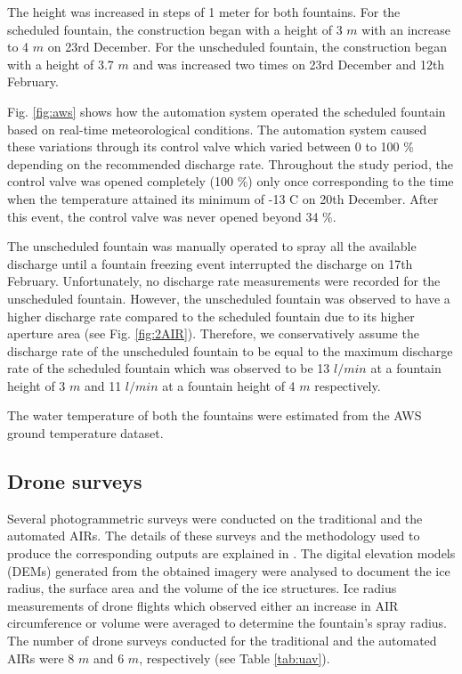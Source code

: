 \documentclass[tc, manuscript]{copernicus}
\begin{document}
The height was increased in steps of 1 meter for both fountains. For the scheduled fountain, the
construction began with a height of 3 $m$ with an increase to 4 $m$ on 23rd December. For the unscheduled
fountain, the construction began with a height of 3.7 $m$ and was increased two times on 23rd December
and 12th February.

Fig. \ref{fig:aws} shows how the automation system operated the scheduled fountain based on real-time
meteorological conditions. The automation system caused these variations through its control valve which varied
between 0 to 100 \% depending on the recommended discharge rate. Throughout the study period, the control valve
was opened completely (100 \%) only once corresponding to the time when the temperature attained its minimum of
-13 \degree C on 20th December. After this event, the control valve was never opened beyond 34 \%.  

The unscheduled fountain was manually operated to spray all the available discharge until a fountain freezing
event interrupted the discharge on 17th February. Unfortunately, no discharge rate measurements were recorded
for the unscheduled fountain. However, the unscheduled fountain was observed to have a higher discharge rate
compared to the scheduled fountain due to its higher aperture area (see Fig. \ref{fig:2AIR}). Therefore, we
conservatively assume the discharge rate of the unscheduled fountain to be equal to the maximum discharge rate
of the scheduled fountain which was observed to be 13 $l/min$ at a fountain height of 3 $m$ and 11 $l/min$ at a
fountain height of 4 $m$ respectively.

The water temperature of both the fountains were estimated from the AWS ground temperature dataset.

\subsection{Drone surveys}

Several photogrammetric surveys were conducted on the traditional and the automated AIRs. The details of these
surveys and the methodology used to produce the corresponding outputs are explained in
\cite{balasubramanianInfluenceMeteorologicalConditions2022}. The digital elevation models (DEMs) generated from
the obtained imagery were analysed to document the ice radius, the surface area and the volume of the ice
structures. Ice radius measurements of drone flights which observed either an increase in AIR circumference or
volume were averaged to determine the fountain's spray radius. The number of drone surveys conducted for the
traditional and the automated AIRs were 8 $m$ and 6 $m$, respectively (see Table \ref{tab:uav}). 
\end{document}
